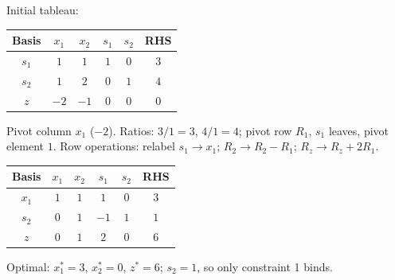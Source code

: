 \begin{solutions}
  \item Initial tableau:
        \begin{center}
        \begin{tabular}{c|cccc|c}
        Basis & $x_1$ & $x_2$ & $s_1$ & $s_2$ & RHS\\
        \hline
        $s_1$ & $1$ & $1$ & $1$ & $0$ & $3$\\
        $s_2$ & $1$ & $2$ & $0$ & $1$ & $4$\\
        \hline
        $z$ & $-2$ & $-1$ & $0$ & $0$ & $0$\\
        \end{tabular}
        \end{center}
        Pivot column $x_1$ ($-2$). Ratios: $3/1=3$, $4/1=4$; pivot row
        $R_1$, $s_1$ leaves, pivot element $1$. Row operations: relabel
        $s_1\to x_1$; $R_2\to R_2-R_1$; $R_z\to R_z+2R_1$.
        \begin{center}
        \begin{tabular}{c|cccc|c}
        Basis & $x_1$ & $x_2$ & $s_1$ & $s_2$ & RHS\\
        \hline
        $x_1$ & $1$ & $1$ & $1$ & $0$ & $3$\\
        $s_2$ & $0$ & $1$ & $-1$ & $1$ & $1$\\
        \hline
        $z$ & $0$ & $1$ & $2$ & $0$ & $6$\\
        \end{tabular}
        \end{center}
        Optimal: $x_1^{*}=3$, $x_2^{*}=0$, $z^{*}=6$; $s_2=1$, so only
        constraint 1 binds.


\end{solutions}
